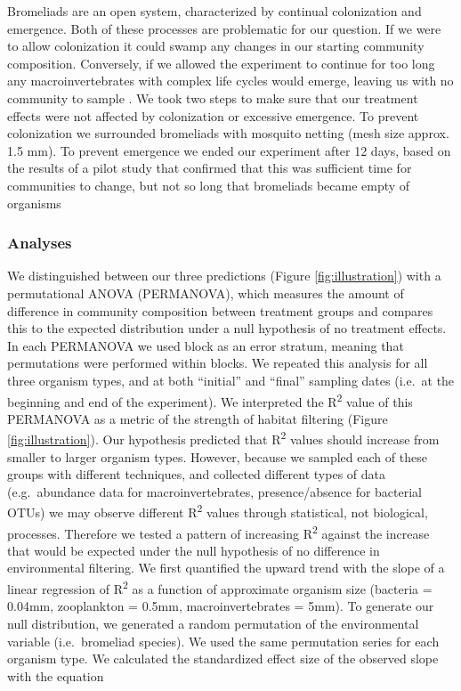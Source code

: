 Bromeliads are an open system, characterized by continual colonization
and emergence. Both of these processes are problematic for our question.
If we were to allow colonization it could swamp any changes in our
starting community composition. Conversely, if we allowed the experiment
to continue for too long any macroinvertebrates with complex life cycles
would emerge, leaving us with no community to sample \citep{Lecraw2014}.
We took two steps to make sure that our treatment effects were not
affected by colonization or excessive emergence. To prevent colonization
we surrounded bromeliads with mosquito netting (mesh size approx. 1.5
mm). To prevent emergence we ended our experiment after 12 days, based
on the results of a pilot study that confirmed that this was sufficient
time for communities to change, but not so long that bromeliads became
empty of organisms

\subsubsection{Analyses}\label{analyses}

We distinguished between our three predictions (Figure \ref{fig:illustration}) with a
permutational ANOVA (PERMANOVA), which measures the amount of difference
in community composition between treatment groups and compares this to
the expected distribution under a null hypothesis of no treatment
effects. In each PERMANOVA we used block as an error stratum, meaning
that permutations were performed within blocks. We repeated this
analysis for all three organism types, and at both ``initial'' and
``final'' sampling dates (i.e.~at the beginning and end of the
experiment). We interpreted the R\textsuperscript{2} value of this
PERMANOVA as a metric of the strength of habitat filtering (Figure \ref{fig:illustration}).
Our hypothesis predicted that R\textsuperscript{2} values should
increase from smaller to larger organism types. However, because we
sampled each of these groups with different techniques, and collected
different types of data (e.g.~abundance data for macroinvertebrates,
presence/absence for bacterial OTUs) we may observe different
R\textsuperscript{2} values through statistical, not biological,
processes. Therefore we tested a pattern of increasing
R\textsuperscript{2} against the increase that would be expected under
the null hypothesis of no difference in environmental filtering. We
first quantified the upward trend with the slope of a linear regression
of R\textsuperscript{2} as a function of approximate organism size
(bacteria = 0.04mm, zooplankton = 0.5mm, macroinvertebrates = 5mm). To
generate our null distribution, we generated a random permutation of the
environmental variable (i.e.~bromeliad species). We used the same
permutation series for each organism type. We calculated the
standardized effect size of the observed slope with the equation

